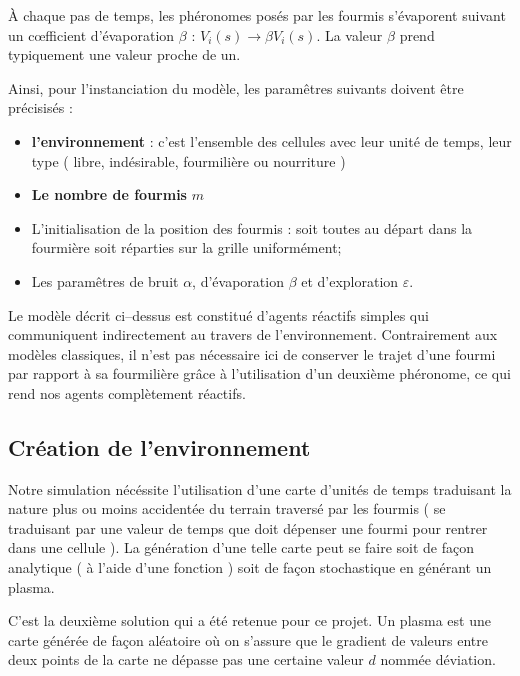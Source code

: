 \documentclass[a4]{article}
\begin{document}
À chaque pas de temps, les phéronomes posés par les fourmis s'évaporent suivant un c{\oe}fficient d'évaporation $\beta$ :
$V_{i}(s) \rightarrow \beta V_{i}(s)$. La valeur $\beta$ prend typiquement une valeur proche de un. 

Ainsi, pour l'instanciation du modèle, les paramêtres suivants doivent être précisisés :
\begin{itemize}
\item \textbf{l'environnement} : c'est l'ensemble des cellules avec leur unité de temps, leur type ( libre, indésirable, fourmilière ou nourriture )
\item \textbf{Le nombre de fourmis} $m$
\item L'initialisation de la position des fourmis : soit toutes au départ dans la fourmière soit réparties sur la grille uniformément;
\item Les paramêtres de bruit $\alpha$, d'évaporation $\beta$ et d'exploration $\varepsilon$.
\end{itemize}

Le modèle décrit ci--dessus est constitué d'agents réactifs simples qui communiquent indirectement au travers de l'environnement. Contrairement aux modèles classiques, il n'est pas nécessaire ici de conserver le trajet d'une fourmi par rapport à sa fourmilière grâce à l'utilisation d'un deuxième phéronome, ce qui rend nos agents complètement réactifs.

\subsection{Création de l'environnement}

Notre simulation nécéssite l'utilisation d'une carte d'unités de temps traduisant la nature plus ou moins accidentée du terrain traversé
par les fourmis ( se traduisant par une valeur de temps que doit dépenser une fourmi pour rentrer dans une cellule ). La génération d'une telle
carte peut se faire soit de façon analytique ( à l'aide d'une fonction ) soit de façon stochastique en générant un plasma.

C'est la deuxième solution qui a été retenue pour ce projet. Un plasma est une carte générée de façon aléatoire où on s'assure que
le gradient de valeurs entre deux points de la carte ne dépasse pas une certaine valeur $d$ nommée déviation.
\end{document}
